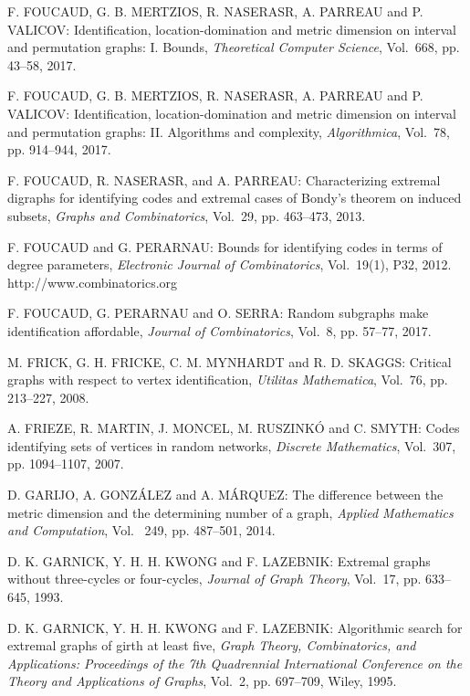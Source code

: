 \begin{thebibliography}{999}
F. FOUCAUD, G. B. MERTZIOS, R. NASERASR, A. PARREAU and P. VALICOV: Identification, location-domination and metric dimension on interval and permutation graphs: I. Bounds, {\it Theoretical Computer Science}, Vol.~668, pp. 43--58, 2017.

F. FOUCAUD, G. B. MERTZIOS, R. NASERASR, A. PARREAU and P. VALICOV: Identification, location-domination and metric dimension on interval and permutation graphs: II. Algorithms and complexity, {\it Algorithmica}, Vol.~78, pp. 914--944, 2017.

F. FOUCAUD, R. NASERASR, and A. PARREAU: Characterizing extremal digraphs for identifying codes and extremal cases of Bondy's theorem on induced subsets, {\it Graphs and Combinatorics}, Vol.~29, pp. 463--473, 2013.

F. FOUCAUD and G. PERARNAU: Bounds for identifying codes in terms of degree parameters, {\it Electronic Journal of Combinatorics}, Vol.~19(1), P32, 2012.\\
http://www.combinatorics.org

F. FOUCAUD, G. PERARNAU and O. SERRA: Random subgraphs make identification affordable, {\it Journal of  Combinatorics}, Vol.~8, pp. 57--77, 2017.

M. FRICK, G. H. FRICKE, C. M. MYNHARDT and R. D. SKAGGS: Critical graphs with respect to vertex identification, {\it Utilitas Mathematica}, Vol.~76, pp. 213--227, 2008.

A. FRIEZE, R. MARTIN, J. MONCEL, M. RUSZINK\'O and C. SMYTH: Codes identifying sets of vertices in random networks, {\it Discrete Mathematics}, Vol.~307, pp. 1094--1107, 2007.

D. GARIJO, A. GONZ\'ALEZ and A. M\'ARQUEZ: The difference between the metric dimension and the determining number of a graph, {\it Applied Mathematics and Computation}, Vol.~ 249, pp. 487--501, 2014.

D. K. GARNICK, Y. H. H. KWONG and F. LAZEBNIK: Extremal graphs without three-cycles or four-cycles, {\it Journal of Graph Theory}, Vol.~17, pp. 633--645, 1993.

D. K. GARNICK, Y. H. H. KWONG and F. LAZEBNIK: Algorithmic search for extremal graphs of girth at least five, {\it Graph Theory, Combinatorics, and Applications: Proceedings of the 7th Quadrennial International Conference on the Theory and Applications of Graphs}, Vol.~2, pp. 697--709, Wiley, 1995.


\end{thebibliography}
